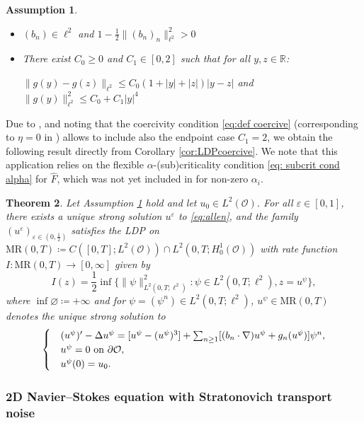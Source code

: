 \documentclass{amsart}
\renewcommand{\MR}{\mathrm{MR}}
\newcommand{\<}{\langle}
\newcommand{\?}{\rangle}
\newcommand{\ceqq}{\coloneqq}
\newcommand{\col}{\colon}
\renewcommand{\O}{\mathcal{O}}
\theoremstyle{plain}
\newtheorem{theorem}{Theorem}[section]
\theoremstyle{remark}
\theoremstyle{plain}
\newtheorem{assumption}[theorem]{Assumption}
\numberwithin{equation}{section}
\def\R{{\mathbb R}}
\newcommand{\eps}{\varepsilon}
\begin{document}
\begin{assumption}\label{ass:allen}

\noindent
\begin{itemize}
\item $(b_n)\in \ell^2$ and $1-\frac12\|(b_n)_n\|_{\ell^2}^2>0$ 
  \item There exist $C_0\geq 0$ and $C_1\in[0,2]$ such that for all $y,z\in \R$: 
  
  \noindent
  $\|g(y)-g(z)\|_{\ell^2} \leq C_0(1+|y|+|z|)|y-z|$ and $\|g(y)\|_{\ell^2}^2\leq C_0+C_1|y|^4$ 
  \end{itemize}
\end{assumption}
Due to \cite[Ex.\ 8.3, Ex.\ 8.4]{BGV}, and noting that the coercivity condition \eqref{eq:def coercive}  (corresponding to $\eta=0$ in \cite{BGV}) allows to include also the endpoint case $C_1=2$, we obtain the following result directly from Corollary \ref{cor:LDPcoercive}. We note that this application relies on the  flexible $\alpha$-(sub)criticality condition \eqref{eq: subcrit cond alpha} for $\hat{F}$, which was not yet included in \cite{TV24} for non-zero $\alpha_i$. 

\begin{theorem}\label{th:allen}
Let Assumption \ref{ass:allen} hold and let $u_0\in L^2(\O)$. 
For all $\eps\in[0,1]$, there exists a unique strong solution $u^\eps$ to \eqref{eq:allen}, and the family $(u^\eps)_{\eps\in(0,\frac12)}$ satisfies the LDP on $\MR(0,T)\ceqq C([0,T];L^2(\O))\cap L^2(0,T;H^1_0(\O))$ with rate function $I\col \MR(0,T)\to[0,\infty]$ given by 
\[
I(z)=\frac12\inf\{\|\psi\|_{L^2(0,T;\ell^2)}^2:\psi \in L^2(0,T;\ell^2), z=u^{\psi} \},
\]
where $\inf\varnothing\ceqq+\infty$ and for $\psi=(\psi^n)\in L^2(0,T;\ell^2)$,  $u^\psi\in  \MR(0,T)$ denotes the unique strong solution to
\begin{equation*} 
     \begin{cases}
   &(u^{\psi})'-\Delta u^{\psi} =[ u^{\psi}-(u^{\psi})^3] +\sum_{n\geq 1}[(b_n\cdot\nabla)u^{\psi}+g_n(u^{\psi})] \psi^n,   \\ 
   &u^{\psi}=0 \textup{ on }\partial\O,\\
   &u^{\psi}(0)=u_0. 
\end{cases}
\end{equation*}
\end{theorem} 

\subsubsection{\textbf{2D Navier--Stokes equation with Stratonovich transport noise}}\label{ss:NS}
\end{document}
